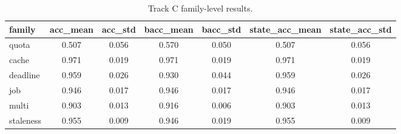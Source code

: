 \begin{table}[t]
\centering
\caption{Track C family-level results.}
\label{tab:track-c-family}
\footnotesize
\begin{tabular}{lcccccc}
\toprule
family & acc_mean & acc_std & bacc_mean & bacc_std & state_acc_mean & state_acc_std \\
\midrule
quota & 0.507 & 0.056 & 0.570 & 0.050 & 0.507 & 0.056 \\
cache & 0.971 & 0.019 & 0.971 & 0.019 & 0.971 & 0.019 \\
deadline & 0.959 & 0.026 & 0.930 & 0.044 & 0.959 & 0.026 \\
job & 0.946 & 0.017 & 0.946 & 0.017 & 0.946 & 0.017 \\
multi & 0.903 & 0.013 & 0.916 & 0.006 & 0.903 & 0.013 \\
staleness & 0.955 & 0.009 & 0.946 & 0.019 & 0.955 & 0.009 \\
\bottomrule
\end{tabular}
\end{table}

